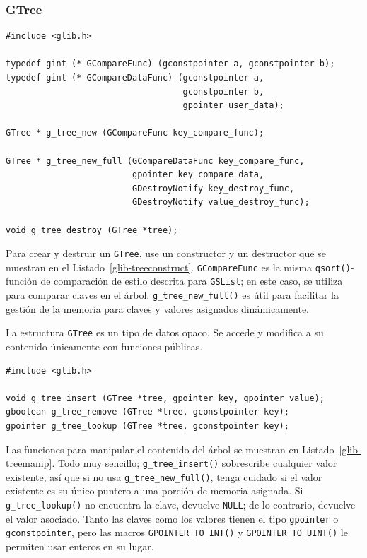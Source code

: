 \subsubsection{GTree}

\begin{lstlisting}[float, caption={Creando y destruyendo árboles binarios balanceados}, label=glib-treeconstruct]
#include <glib.h>

typedef gint (* GCompareFunc) (gconstpointer a, gconstpointer b);
typedef gint (* GCompareDataFunc) (gconstpointer a,
                                   gconstpointer b,
                                   gpointer user_data);

GTree * g_tree_new (GCompareFunc key_compare_func);

GTree * g_tree_new_full (GCompareDataFunc key_compare_func,
                         gpointer key_compare_data,
                         GDestroyNotify key_destroy_func,
                         GDestroyNotify value_destroy_func);

void g_tree_destroy (GTree *tree);
\end{lstlisting}

Para crear y destruir un \lstinline{GTree}, use un constructor y un destructor que se muestran en el Listado~\ref{glib-treeconstruct}. \lstinline{GCompareFunc} es la misma \lstinline{qsort()}-función de comparación de estilo descrita para \lstinline{GSList}; en este caso, se utiliza para comparar claves en el árbol. \lstinline{g_tree_new_full()} es útil para facilitar la gestión de la memoria para claves y valores asignados dinámicamente.

La estructura \lstinline{GTree} es un tipo de datos opaco. Se accede y modifica a su contenido únicamente con funciones públicas.

\begin{lstlisting}[float, caption={Manipular el contenido de \lstinline{GTree}}, label=glib-treemanip]
#include <glib.h>

void g_tree_insert (GTree *tree, gpointer key, gpointer value);
gboolean g_tree_remove (GTree *tree, gconstpointer key);
gpointer g_tree_lookup (GTree *tree, gconstpointer key);
\end{lstlisting}

Las funciones para manipular el contenido del árbol se muestran en Listado~\ref{glib-treemanip}. Todo muy sencillo; \lstinline{g_tree_insert()} sobrescribe cualquier valor existente, así que si no usa \lstinline{g_tree_new_full()}, tenga cuidado si el valor existente es su único puntero a una porción de memoria asignada. Si \lstinline{g_tree_lookup()} no encuentra la clave, devuelve \lstinline{NULL}; de lo contrario, devuelve el valor asociado. Tanto las claves como los valores tienen el tipo \lstinline{gpointer} o \lstinline{gconstpointer}, pero las macros \lstinline{GPOINTER_TO_INT()} y \lstinline{GPOINTER_TO_UINT()} le permiten usar enteros en su lugar.

